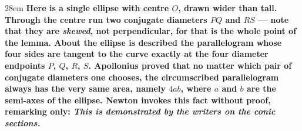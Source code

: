 \documentclass[border=4pt]{standalone}
\begin{document}
\begin{varwidth}{28em}
\large\bfseries
Here is a single \textcolor{ellblue}{ellipse} with centre $O$, drawn wider than tall. Through the centre run two \textcolor{conjorange}{conjugate diameters} $PQ$ and $RS$ --- note that they are \emph{skewed}, not perpendicular, for that is the whole point of the lemma. About the ellipse is described the \textcolor{pargreen}{parallelogram} whose four sides are tangent to the curve exactly at the four diameter endpoints $P$, $Q$, $R$, $S$. Apollonius proved that no matter which pair of conjugate diameters one chooses, the circumscribed parallelogram always has the very same area, namely $4ab$, where $a$ and $b$ are the semi-axes of the ellipse. Newton invokes this fact without proof, remarking only: \textit{This is demonstrated by the writers on the conic sections.}
\end{varwidth}
\end{document}
